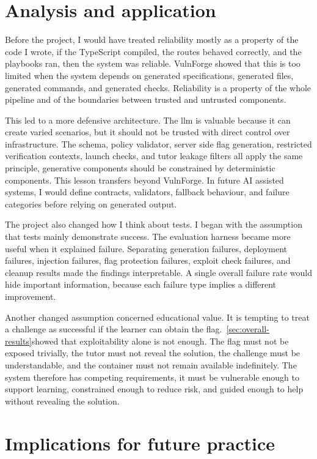 \section{Analysis and application}\label{sec:reflection}

Before the project, I would have treated reliability mostly as a property of the code I wrote, if the TypeScript compiled, the routes behaved correctly, and the playbooks ran, then the system was reliable. VulnForge showed that this is too limited when the system depends on generated specifications, generated files, generated commands, and generated checks. Reliability is a property of the whole pipeline and of the boundaries between trusted and untrusted components.

This led to a more defensive architecture. The \gls{llm} is valuable because it can create varied scenarios, but it should not be trusted with direct control over infrastructure. The schema, policy validator, server side flag generation, restricted verification contexts, launch checks, and tutor leakage filters all apply the same principle, generative components should be constrained by deterministic components. This lesson transfers beyond VulnForge. In future AI assisted systems, I would define contracts, validators, fallback behaviour, and failure categories before relying on generated output.

The project also changed how I think about tests. I began with the assumption that tests mainly demonstrate success. The evaluation harness became more useful when it explained failure. Separating generation failures, deployment failures, injection failures, flag protection failures, exploit check failures, and cleanup results made the findings interpretable. A single overall failure rate would hide important information, because each failure type implies a different improvement.

Another changed assumption concerned educational value. It is tempting to treat a challenge as successful if the learner can obtain the flag.~\ref{sec:overall-results}showed that exploitability alone is not enough. The flag must not be exposed trivially, the tutor must not reveal the solution, the challenge must be understandable, and the container must not remain available indefinitely. The system therefore has competing requirements, it must be vulnerable enough to support learning, constrained enough to reduce risk, and guided enough to help without revealing the solution.

\section{Implications for future practice}\label{sec:implications}

